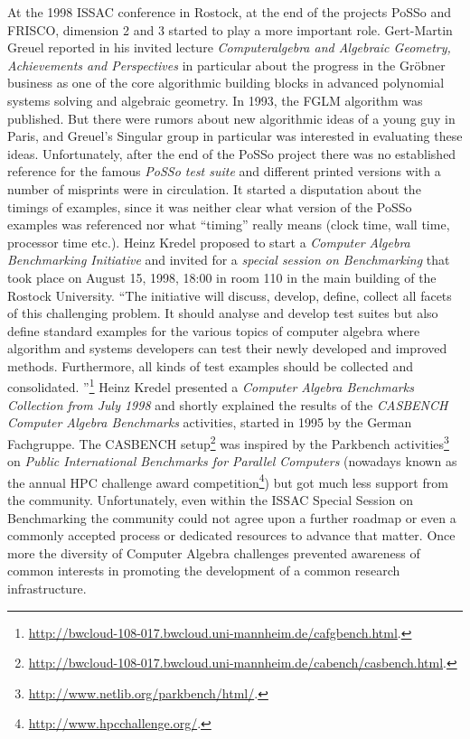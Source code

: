\documentclass[a4paper,11pt]{article}
\begin{document}
At the 1998 ISSAC conference in Rostock, at the end of the projects PoSSo and
FRISCO, dimension 2 and 3 started to play a more important role.  Gert-Martin
Greuel reported in his invited lecture \emph{Computeralgebra and Algebraic
  Geometry, Achievements and Perspectives} in particular about the progress in
the Gr\"obner business as one of the core algorithmic building blocks in
advanced polynomial systems solving and algebraic geometry.  In 1993, the FGLM
algorithm was published. But there were rumors about new algorithmic ideas of a
young guy in Paris, and Greuel's Singular group in particular was interested in
evaluating these ideas.  Unfortunately, after the end of the PoSSo project
there was no established reference for the famous \emph{PoSSo test suite} and
different printed versions with a number of misprints were in circulation.  It
started a disputation about the timings of examples, since it was neither clear
what version of the PoSSo examples was referenced nor what ``timing'' really
means (clock time, wall time, processor time etc.).  Heinz Kredel proposed to
start a \emph{Computer Algebra Benchmarking Initiative} and invited for a
\emph{special session on Benchmarking} that took place on August 15, 1998,
18:00 in room 110 in the main building of the Rostock University.  ``The
initiative will discuss, develop, define, collect all facets of this
challenging problem. It should analyse and develop test suites but also define
standard examples for the various topics of computer algebra where algorithm
and systems developers can test their newly developed and improved
methods. Furthermore, all kinds of test examples should be collected and
consolidated. ''\footnote{\url{http://bwcloud-108-017.bwcloud.uni-mannheim.de/cafgbench.html}.}
Heinz Kredel presented a \emph{Computer Algebra Benchmarks Collection from July
  1998} and shortly explained the results of the \emph{CASBENCH Computer
  Algebra Benchmarks} activities, started in 1995 by the German Fachgruppe.
The CASBENCH
setup\footnote{\url{http://bwcloud-108-017.bwcloud.uni-mannheim.de/cabench/casbench.html}.}
was inspired by the Parkbench
activities\footnote{\url{http://www.netlib.org/parkbench/html/}.} on
\emph{Public International Benchmarks for Parallel Computers} (nowadays known
as the annual HPC challenge award
competition\footnote{\url{http://www.hpcchallenge.org/}.}) but got much less
support from the community. Unfortunately, even within the ISSAC Special
Session on Benchmarking the community could not agree upon a further roadmap or
even a commonly accepted process or dedicated resources to advance that
matter. Once more the diversity of Computer Algebra challenges prevented
awareness of common interests in promoting the development of a common research
infrastructure.
\end{document}
